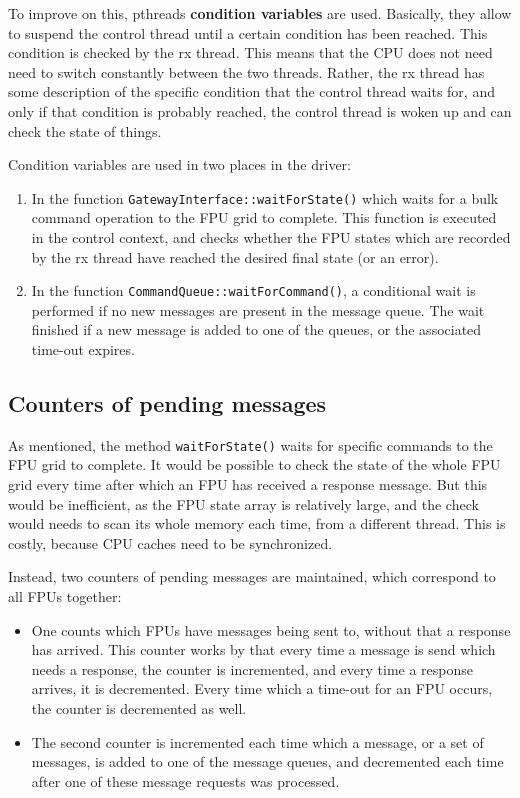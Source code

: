 \documentclass[fontsize=12,a4paper]{scrartcl}
\begin{document}
To improve on this, pthreads \textbf{condition variables} are used.
Basically, they allow to suspend the control thread until a certain
condition has been reached. This condition is checked by the rx
thread. This means that the CPU does not need need to switch
constantly between the two threads. Rather, the rx thread has some
description of the specific condition that the control thread waits
for, and only if that condition is probably reached, the control
thread is woken up and can check the state of things.

Condition variables are used in two places in the driver:

\begin{enumerate}
\item In the function \texttt{GatewayInterface::waitForState()} which
  waits for a bulk command operation to the
  FPU grid to complete. This function is executed
  in the control context, and checks whether the FPU
  states which are recorded by the rx thread have
  reached the desired final state (or an error).
\item In the function \texttt{CommandQueue::waitForCommand()}, a
  conditional wait is performed if no new messages are present in the
  message queue. The wait finished if a new message is added to one of
  the queues, or the associated time-out expires.
  
\end{enumerate}


\subsection{Counters of pending messages}

As mentioned, the method \texttt{waitForState()} waits
for specific commands to the FPU grid to complete.
It would be possible to check the state of the
whole FPU grid every time after which an FPU has
received a response message. But this would be inefficient,
as the FPU state array is relatively large, and
the check would needs to scan its whole memory
each time, from a different thread. This is costly,
because CPU caches need to be synchronized.

Instead, two counters of pending messages are maintained, which
correspond to all FPUs together:

\begin{itemize}
\item One counts which FPUs have messages being sent to, without that
  a response has arrived. This counter works by that every time a
  message is send which needs a response, the counter is incremented,
  and every time a response arrives, it is decremented. Every time
  which a time-out for an FPU occurs, the counter is decremented as
  well.
\item The second counter is incremented each time which a message,
  or a set of messages, is added to one of the message queues,
  and decremented each time after one of these
  message requests was processed.
\end{itemize}
\end{document}
